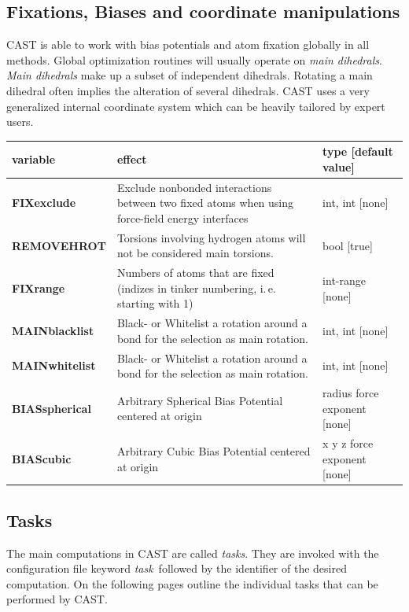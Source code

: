 \documentclass[10pt,a4paper]{article} %
\begin{document}
\subsection{Fixations, Biases and coordinate manipulations}
\ac{CAST} is able to work with bias potentials and atom fixation globally in all methods. Global optimization routines will usually operate on \textit{main dihedrals}. \textit{Main dihedrals} make up a subset of independent dihedrals. Rotating a main dihedral often implies the alteration of several dihedrals. \ac{CAST} uses a very generalized internal coordinate system which can be heavily tailored by expert users.
\begin{longtable}{|p{3.5cm}|p{5cm}|p{3cm}|}
	variable & effect & type [default value] \\
	\hline
	\textbf{FIXexclude} & Exclude nonbonded interactions between two fixed atoms when using force-field energy interfaces & int, int [none] \\
	\textbf{REMOVEHROT} & Torsions involving hydrogen atoms will not be considered main torsions. & bool [true] \\	
	\textbf{FIXrange} & Numbers of atoms that are fixed (indizes in tinker numbering, i.\,e. starting with 1) & int-range [none] \\
	\textbf{MAINblacklist} & Black- or Whitelist a rotation around a bond for the selection as main rotation. & int, int [none] \\
	\textbf{MAINwhitelist} & Black- or Whitelist a rotation around a bond for the selection as main rotation. & int, int [none] \\
	\textbf{BIASspherical} & Arbitrary Spherical Bias Potential centered at origin & radius force exponent [none] \\
	\textbf{BIAScubic} & Arbitrary Cubic Bias Potential centered at origin & x y z force exponent [none] \\
\end{longtable} 
	
	
	\subsection{Tasks}
	The main computations in \ac{CAST} are called \textit{tasks}. They are invoked with the configuration file keyword \glqq\textit{task}\grqq~followed by the identifier of the desired computation. On the following pages outline the individual tasks that can be performed by \ac{CAST}.

	\newpage
\end{document}
